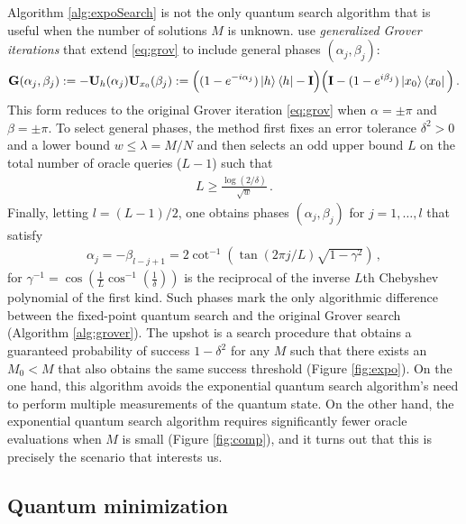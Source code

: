 \documentclass[12pt]{article} %
\begin{document}
 
Algorithm \ref{alg:expoSearch} is not the only quantum search algorithm that is useful when the number of solutions $M$ is unknown.  \citet{yoder2014fixed} use \emph{generalized Grover iterations} that extend \eqref{eq:grov} to include general phases $(\alpha_j,\beta_j)$:
\begin{align}\label{eq:grovGen}
	\mathbf{G}(\alpha_j,\beta_j) := - \mathbf{U}_h(\alpha_j) \mathbf{U}_{x_0}(\beta_j) := \Big((1-e^{-i\alpha_j})\ket{h}\bra{h}-\mathbf{I} \Big) \Big( \mathbf{I} - (1-e^{i\beta_j}) \ket{x_0}\bra{x_0} \Big) \, .
\end{align}
This form reduces to the original Grover iteration \eqref{eq:grov} when $\alpha=\pm \pi$ and $\beta=\pm \pi$.
To select general phases, the method first fixes an error tolerance $\delta^2>0$ and a lower bound $w\leq \lambda=M/N$ and then selects an odd upper bound $L$ on the total number of oracle queries ($L-1$) such that 
\begin{align*}
	L \geq \frac{\log(2/\delta)}{\sqrt{w}} \, .
\end{align*}
Finally,  letting $l=(L-1)/2$, one obtains phases $(\alpha_j,\beta_j)$ for $j=1,\dots,l$ that satisfy
\begin{align*}
	\alpha_j = - \beta_{l-j+1} =2 \cot^{-1} \left( \tan(2\pi j /L) \sqrt{1-\gamma^2} \right) \, ,
\end{align*}
 for $\gamma^{-1} =  \cos(\frac{1}{L}\cos^{-1}(\frac{1}{\delta}))$ is the reciprocal of the inverse  $L$th Chebyshev polynomial of the first kind.  Such phases mark the only algorithmic difference between the fixed-point quantum search and the original Grover search (Algorithm \ref{alg:grover}).  The upshot is a search procedure that obtains a guaranteed probability of success $1-\delta^2$ for any $M$ such that there exists an $M_0<M$ that also obtains the same success threshold (Figure \ref{fig:expo}).  On the one hand, this algorithm avoids the exponential quantum search algorithm's need to perform multiple measurements of the quantum state.  On the other hand, the exponential quantum search algorithm requires significantly fewer oracle evaluations when $M$ is small (Figure \ref{fig:comp}), and it turns out that this is precisely the scenario that interests us.
 
 \subsection{Quantum minimization}\label{sec:qmin}
\end{document}
